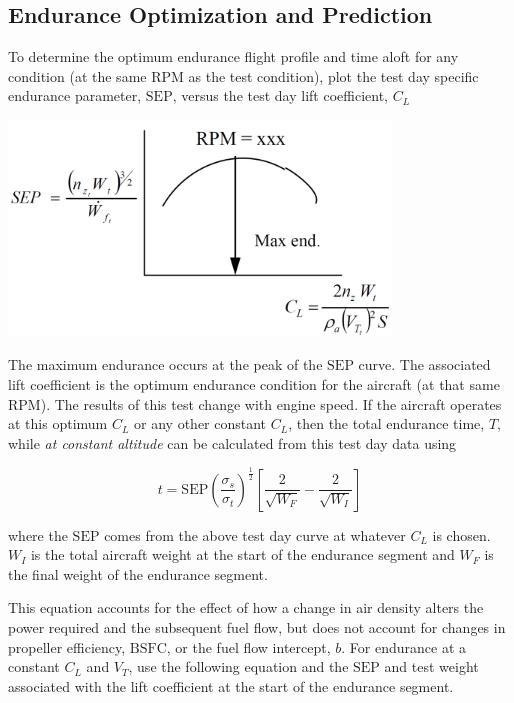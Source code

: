 \documentclass[
]{book}
\begin{document}
\hypertarget{endurance-optimization-and-prediction}{%
\subsection{Endurance Optimization and Prediction}\label{endurance-optimization-and-prediction}}

To determine the optimum endurance flight profile and time aloft for any
condition (at the same \(\mathrm{RPM}\) as the test condition), plot the test day
specific endurance parameter, \(\mathrm{SEP}\), versus the test day lift
coefficient, \(C_L\)

\includegraphics[width=4in,height=\textheight]{media/12/sep-c-sub-l-curve.png}

The maximum endurance occurs at the peak of the \(\mathrm{SEP}\) curve. The
associated lift coefficient is the optimum endurance condition for the aircraft
(at that same \(\mathrm{RPM}\)). The results of this test change with engine
speed. If the aircraft operates at this optimum \(C_L\) or any other constant
\(C_L\), then the total endurance time, \(T\), while \emph{at constant altitude} can
be calculated from this test day data using

\[
t = \mathrm{SEP} \left( \frac{\sigma_s}{\sigma_t} \right)^{\frac{1}{2}} \left[ \frac{2}{\sqrt{W_F}} - \frac{2}{\sqrt{W_I}} \right]
\label{eq:tot-endur-time}
\]

where the \(\mathrm{SEP}\) comes from the above test day curve at whatever
\(C_L\) is chosen. \(W_I\) is the total aircraft weight at the start of the
endurance segment and \(W_F\) is the final weight of the endurance segment.

This equation accounts for the effect of how a change in air density alters the
power required and the subsequent fuel flow, but does not account for changes in
propeller efficiency, \(\mathrm{BSFC}\), or the fuel flow intercept, \(b\).
For endurance at a constant \(C_L\) and \(V_T\), use the following equation and
the \(\mathrm{SEP}\) and test weight associated with the lift coefficient at the
start of the endurance segment.
\end{document}
